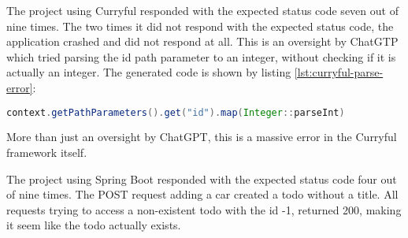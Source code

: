 \documentclass[a4paper,titlepage]{article}
\begin{document}
\noindent The project using Curryful responded with the expected status code
seven out of nine times. The two times it did not respond with the expected
status code, the application crashed and did not respond at all. This is an
oversight by ChatGTP which tried parsing the id path parameter to an integer,
without checking if it is actually an integer. The generated code is shown by
listing \ref{lst:curryful-parse-error}:\newline

\begin{lstlisting}[language=Java, caption=ChatGPT generated code parsing to int
		without precaution, captionpos=b, label=lst:curryful-parse-error]
context.getPathParameters().get("id").map(Integer::parseInt)
\end{lstlisting}

\noindent More than just an oversight by ChatGPT, this is a massive error in the
Curryful framework itself.
\newline

\noindent The project using Spring Boot responded with the expected status code
four out of nine times. The POST request adding a car created a todo without a
title. All requests trying to access a non-existent todo with the id -1,
returned 200, making it seem like the todo actually exists.
\end{document}
